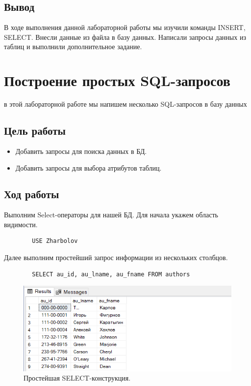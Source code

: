 \subsection{Вывод}
В ходе выполнения данной лабораторной работы мы изучили команды INSERT, SELECT. Внесли данные из файла в базу данных. Написали запросы данных из таблиц и выполнили дополнительное задание. 

\section{Построение простых SQL-запросов}
в этой лабораторной работе мы напишем несколько SQL-запросов в базу данных

\subsection{Цель работы}
\begin{itemize}
    \item Добавить запросы для поиска данных в БД.
    \item Добавить запросы для выбора атрибутов таблиц.
\end{itemize}
\subsection{Ход работы}
Выполним Select-операторы для нашей БД. Для начала укажем область видимости.
\begin{verbatim}
        USE Zharbolov
\end{verbatim}

Далее выполним простейший запрос информации из нескольких столбцов.

\begin{verbatim}
        SELECT au_id, au_lname, au_fname FROM authors
\end{verbatim}

\begin{figure}[h!]
    \centering
    \includegraphics[width=0.9\linewidth]{Pic/lab4/SQ1.PNG}
    \caption{Простейшая SELECT-конструкция.}
    \label{fig:SELECT1}
\end{figure}

